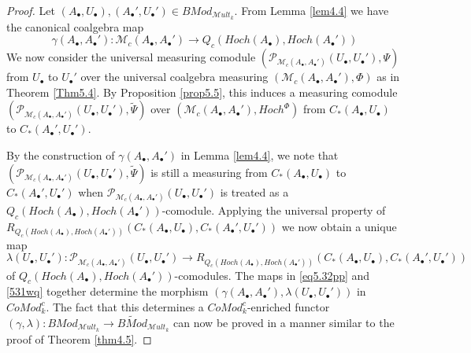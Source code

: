 \documentclass[10pt, colorlinks]{article}
\numberwithin{equation}{section} \DeclareMathSizes{2}{10}{12}{13}
\begin{document}
\begin{proof}
  Let $(A_\bullet,U_\bullet),(A_\bullet',U_\bullet')\in{BMod}_{\mathscr Mult_k}$. From Lemma \ref{lem4.4} we have the canonical coalgebra map
    \begin{equation}\label{eq5.32pp}
      \gamma(A_\bullet, A_\bullet'):\mathcal M_c(A_\bullet,A_\bullet')\longrightarrow Q_c(Hoch(A_\bullet),Hoch(A_\bullet'))
    \end{equation}
     We now consider the universal measuring comodule $(\mathcal P_{\mathcal M_c(A_\bullet,A_\bullet')}(U_\bullet,U_\bullet'),\Psi)$ from $U_\bullet$ to $U_\bullet'$ over the universal coalgebra measuring $(\mathcal M_c(A_\bullet,A_\bullet'),\Phi)$ as in Theorem \ref{Thm5.4}. By Proposition \ref{prop5.5}, this induces a measuring comodule $(\mathcal P_{\mathcal M_c(A_\bullet,A_\bullet')}(U_\bullet,U_\bullet'),\widetilde{\Psi})$ over $( \mathcal M_c(A_\bullet,A_\bullet'),Hoch^{\Phi})$ from $C_*(A_\bullet,U_\bullet)$ to $C_*(A_\bullet',U_\bullet')$. 
     
     \smallskip By the construction of $\gamma(A_\bullet, A_\bullet')$ in Lemma \ref{lem4.4}, we note that $(\mathcal P_{\mathcal M_c(A_\bullet,A_\bullet')}(U_\bullet,U_\bullet'),\widetilde{\Psi})$  is still a measuring from $C_*(A_\bullet,U_\bullet)$ to $C_*(A_\bullet',U_\bullet')$ when $\mathcal P_{\mathcal M_c(A_\bullet,A_\bullet')}(U_\bullet,U_\bullet')$ is treated as a 
     $ Q_c(Hoch(A_\bullet),Hoch(A_\bullet'))$-comodule. 
Applying the  universal property of $R_{Q_c(Hoch(A_\bullet),Hoch(A_\bullet'))}(C_*(A_\bullet,U_\bullet),C_*(A_\bullet',U_\bullet'))$ we now obtain a unique map
    \begin{equation}\label{531wq}
        \lambda(U_\bullet,U_\bullet'):\mathcal P_{\mathcal M_c(A_\bullet,A_\bullet')}(U_\bullet,U_\bullet')\longrightarrow R_{Q_c(Hoch(A_\bullet),Hoch(A_\bullet'))}(C_*(A_\bullet,U_\bullet),C_*(A_\bullet',U_\bullet') )
    \end{equation} of  $ Q_c(Hoch(A_\bullet),Hoch(A_\bullet'))$-comodules. The maps in \eqref{eq5.32pp} and \eqref{531wq} together determine the morphism $\left(\gamma(A_\bullet,A_\bullet'),\lambda(U_\bullet,U_\bullet')\right)$  in $CoMod_k^c$. The fact that this determines a $CoMod^c_k$-enriched functor $(\gamma,\lambda): BMod_{\mathscr Mult_k}\longrightarrow \widetilde{BMod}_{\mathscr Mult_k}$  can now be proved in a manner similar to the proof of Theorem \ref{thm4.5}. 
\end{proof}
\end{document}
